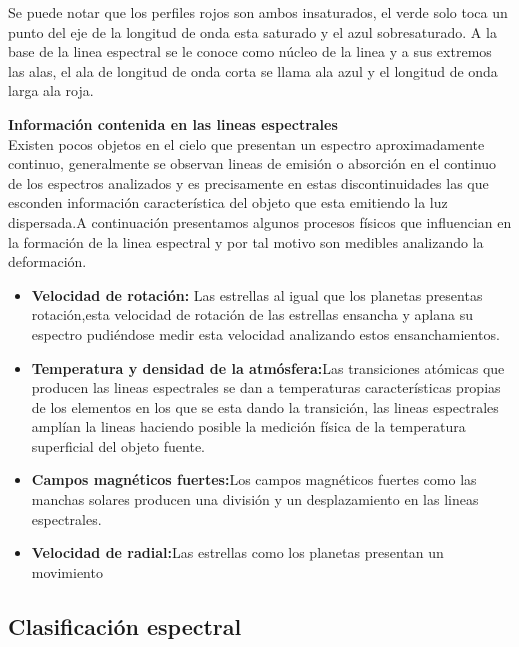 \noindent Se puede notar que los perfiles rojos son ambos insaturados, el verde solo toca un punto del eje de la longitud de onda esta saturado y el azul sobresaturado. A la base de la linea espectral se le conoce como núcleo de la linea y a sus extremos las alas, el ala de longitud de onda corta se llama ala azul y el longitud de onda larga ala roja.
\newpage




\noindent \textbf{Información contenida en las lineas espectrales}\\

\noindent  Existen pocos objetos en el cielo que presentan un espectro aproximadamente continuo, generalmente se observan lineas de emisión o absorción en el continuo de los espectros analizados y es precisamente en estas discontinuidades las que esconden información característica del objeto que esta emitiendo la luz dispersada.A continuación presentamos algunos procesos físicos que influencian en la formación de la linea espectral y por tal motivo son medibles analizando la deformación.

\begin{itemize}
    \item \textbf{Velocidad de rotación:} Las estrellas al igual que los planetas presentas rotación,esta velocidad de rotación de las estrellas ensancha y aplana su espectro pudiéndose medir esta velocidad analizando  estos ensanchamientos.
    \item \textbf{Temperatura y densidad de la atmósfera:}Las transiciones atómicas que producen las lineas espectrales se dan a temperaturas características propias de los elementos en los que se esta dando la transición, las lineas espectrales amplían la lineas haciendo posible la medición física de la temperatura superficial del objeto fuente.
    \item \textbf{Campos magnéticos fuertes:}Los campos magnéticos fuertes como las manchas solares producen una división y un desplazamiento en las lineas espectrales.
    \item \textbf{Velocidad de radial:}Las estrellas como los planetas presentan un movimiento 
    
    
    
    
    
    
    
    
\end{itemize}{}





\subsection {Clasificación espectral}



